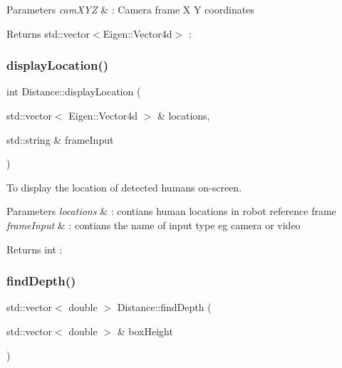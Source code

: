 \begin{DoxyParams}{Parameters}
{\em cam\+X\+YZ} & \+: Camera frame X Y coordinates \\
\hline
\end{DoxyParams}
\begin{DoxyReturn}{Returns}
std\+::vector$<$\+Eigen\+::\+Vector4d$>$ \+: 
\end{DoxyReturn}
\mbox{\label{classDistance_a08964f47af73ec94f0ce46c29ceec36f}} 
\subsubsection{\texorpdfstring{display\+Location()}{displayLocation()}}
{\footnotesize\ttfamily int Distance\+::display\+Location (\begin{DoxyParamCaption}\item[{std\+::vector$<$ Eigen\+::\+Vector4d $>$ \&}]{locations,  }\item[{std\+::string \&}]{frame\+Input }\end{DoxyParamCaption})}



To display the location of detected humans on-\/screen. 


\begin{DoxyParams}{Parameters}
{\em locations} & \+: contians human locations in robot reference frame \\
\hline
{\em frame\+Input} & \+: contians the name of input type eg camera or video \\
\hline
\end{DoxyParams}
\begin{DoxyReturn}{Returns}
int \+: 
\end{DoxyReturn}
\mbox{\label{classDistance_a9371ccc57f5038e09c65f15f7094b5b5}} 
\subsubsection{\texorpdfstring{find\+Depth()}{findDepth()}}
{\footnotesize\ttfamily std\+::vector$<$ double $>$ Distance\+::find\+Depth (\begin{DoxyParamCaption}\item[{std\+::vector$<$ double $>$ \&}]{box\+Height }\end{DoxyParamCaption})}



